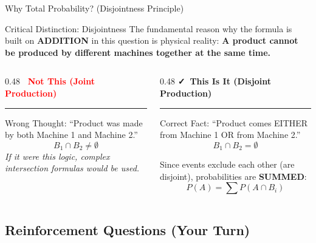 \documentclass[light]{lutbeamer}
\begin{document}
\begin{frame}{Why Total Probability? (Disjointness Principle)}
    \begin{alertblock}{Critical Distinction: Disjointness}
        The fundamental reason why the formula is built on \textbf{ADDITION} in this question is physical reality:
        \textbf{A product cannot be produced by different machines together at the same time.}
    \end{alertblock}

    \vspace{0.5cm}
    \begin{columns}[T]
        \begin{column}{0.48\textwidth}
            \centering
            \textbf{\textcolor{red}{\faTimes\ Not This (Joint Production)}}
            \par\noindent\rule{0.8\textwidth}{0.4pt}
            \vspace{0.2cm}
            \scriptsize
            Wrong Thought: ``Product was made by both Machine 1 and Machine 2.''
            \[ B_1 \cap B_2 \neq \emptyset \]
            \textit{If it were this logic, complex intersection formulas would be used.}
        \end{column}
        \begin{column}{0.48\textwidth}
            \centering
            \textbf{\textcolor{green!60!black}{\faCheck\ This Is It (Disjoint Production)}}
            \par\noindent\rule{0.8\textwidth}{0.4pt}
            \vspace{0.2cm}
            \scriptsize
            Correct Fact: ``Product comes EITHER from Machine 1 OR from Machine 2.''
            \[ B_1 \cap B_2 = \emptyset \]
            
            Since events exclude each other (are disjoint), probabilities are \textbf{SUMMED}:
            \[ P(A) = \sum P(A \cap B_i) \]
        \end{column}
    \end{columns}
\end{frame}

\subsection{Reinforcement Questions (Your Turn)}
\end{document}
